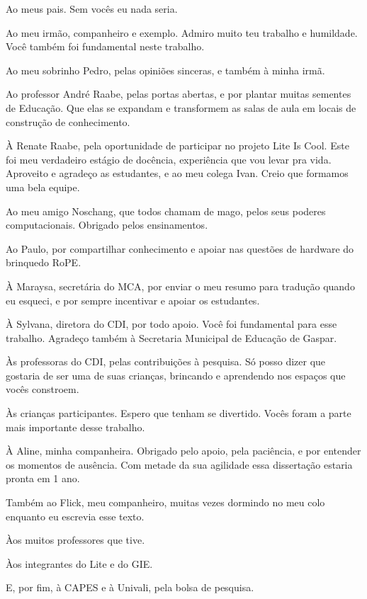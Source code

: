 \begin{agradecimentos}

    Ao meus pais. Sem vocês eu nada seria. 

    Ao meu irmão, companheiro e exemplo. Admiro muito teu trabalho e humildade. Você também foi fundamental neste trabalho. 

    Ao meu sobrinho Pedro, pelas opiniões sinceras, e também à minha irmã.

    Ao professor André Raabe, pelas portas abertas, e por plantar muitas sementes de Educação. Que elas se expandam e transformem as salas de aula em locais de construção de conhecimento.

    À Renate Raabe, pela oportunidade de participar no projeto Lite Is Cool. Este foi meu verdadeiro estágio de docência, experiência que vou levar pra vida. Aproveito e agradeço as estudantes, e ao meu colega Ivan. Creio que formamos uma bela equipe.

    Ao meu amigo Noschang, que todos chamam de mago, pelos seus poderes computacionais. Obrigado pelos ensinamentos.

    Ao Paulo, por compartilhar conhecimento e apoiar nas questões de hardware do brinquedo RoPE.

    À Maraysa, secretária do MCA, por enviar o meu resumo para tradução quando eu esqueci, e por sempre incentivar e apoiar os estudantes.

    À Sylvana, diretora do CDI, por todo apoio. Você foi fundamental para esse trabalho. Agradeço também à Secretaria Municipal de Educação de Gaspar. 

    Às professoras do CDI, pelas contribuições à pesquisa. Só posso dizer que gostaria de ser uma de suas crianças, brincando e aprendendo nos espaços que vocês constroem.
    
    Às crianças participantes. Espero que tenham se divertido. Vocês foram a parte mais importante desse trabalho.

    À Aline, minha companheira. Obrigado pelo apoio, pela paciência, e por entender os momentos de ausência. Com metade da sua agilidade essa dissertação estaria pronta em 1 ano.

    Também ao Flick, meu companheiro, muitas vezes dormindo no meu colo enquanto eu escrevia esse texto.

    Àos muitos professores que tive.

    Àos integrantes do Lite e do GIE.

    E, por fim, à CAPES e à Univali, pela bolsa de pesquisa. 

\end{agradecimentos}